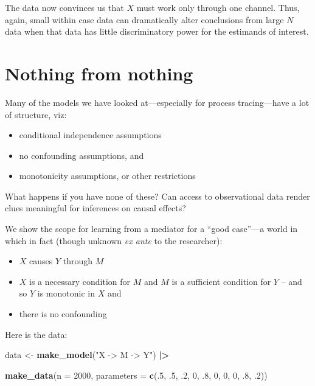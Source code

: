 \documentclass[
  12pt,
]{book}
\newenvironment{Shaded}{\begin{snugshade}}{\end{snugshade}}
\newcommand{\AttributeTok}[1]{\textcolor[rgb]{0.13,0.29,0.53}{#1}}
\newcommand{\DecValTok}[1]{\textcolor[rgb]{0.00,0.00,0.81}{#1}}
\newcommand{\FunctionTok}[1]{\textcolor[rgb]{0.13,0.29,0.53}{\textbf{#1}}}
\newcommand{\NormalTok}[1]{#1}
\newcommand{\OtherTok}[1]{\textcolor[rgb]{0.56,0.35,0.01}{#1}}
\newcommand{\SpecialCharTok}[1]{\textcolor[rgb]{0.81,0.36,0.00}{\textbf{#1}}}
\newcommand{\StringTok}[1]{\textcolor[rgb]{0.31,0.60,0.02}{#1}}
\providecommand{\tightlist}{%
  \setlength{\itemsep}{0pt}\setlength{\parskip}{0pt}}
\begin{document}
The data now convinces us that \(X\) must work only through one channel. Thus, again, small within case data can dramatically alter conclusions from large \(N\) data when that data has little discriminatory power for the estimands of interest.

\hypertarget{nothing-from-nothing}{%
\section{Nothing from nothing}\label{nothing-from-nothing}}

Many of the models we have looked at---especially for process tracing---have a lot of structure, viz:

\begin{itemize}
\tightlist
\item
  conditional independence assumptions
\item
  no confounding assumptions, and
\item
  monotonicity assumptions, or other restrictions
\end{itemize}

What happens if you have none of these? Can access to observational data render clues meaningful for inferences on causal effects?

We show the scope for learning from a mediator for a ``good case''---a world in which in fact (though unknown \emph{ex ante} to the researcher):

\begin{itemize}
\tightlist
\item
  \(X\) causes \(Y\) through \(M\)
\item
  \(X\) is a necessary condition for \(M\) and \(M\) is a sufficient condition for \(Y\) -- and so \(Y\) is monotonic in \(X\) and
\item
  there is no confounding
\end{itemize}

Here is the data:

\begin{Shaded}
\begin{Highlighting}[]
\NormalTok{data }\OtherTok{\textless{}{-}} \FunctionTok{make\_model}\NormalTok{(}\StringTok{"X {-}\textgreater{} M {-}\textgreater{} Y"}\NormalTok{) }\SpecialCharTok{|\textgreater{}} 
  
        \FunctionTok{make\_data}\NormalTok{(}\AttributeTok{n =} \DecValTok{2000}\NormalTok{, }
                  \AttributeTok{parameters =} \FunctionTok{c}\NormalTok{(.}\DecValTok{5}\NormalTok{, .}\DecValTok{5}\NormalTok{, .}\DecValTok{2}\NormalTok{, }\DecValTok{0}\NormalTok{, .}\DecValTok{8}\NormalTok{, }\DecValTok{0}\NormalTok{, }\DecValTok{0}\NormalTok{, }\DecValTok{0}\NormalTok{, .}\DecValTok{8}\NormalTok{, .}\DecValTok{2}\NormalTok{))}
\end{Highlighting}
\end{Shaded}
\end{document}
